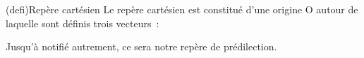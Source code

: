 \documentclass[../../main/main.tex]{subfiles}
\begin{document}
\begin{tcb}[sidebyside, righthand ratio=.25](defi){Repère cartésien}
	Le repère cartésien est constitué d'une origine O autour de laquelle sont
	définis trois vecteurs~:
	\begin{center}
	\end{center}
	Jusqu'à notifié autrement, ce sera notre repère de prédilection.
	\tcblower
	\begin{center}
		\captionsetup{justification=centering}
	\end{center}
\end{tcb}
\end{document}
